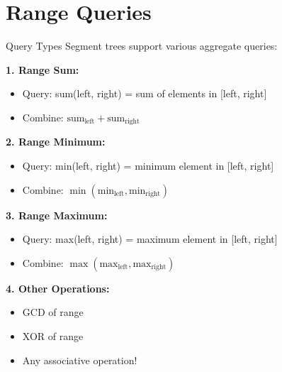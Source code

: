 \documentclass[aspectratio=169]{beamer}
\begin{document}
\section{Range Queries}

\begin{frame}{Query Types}
  Segment trees support various aggregate queries:

  \vspace{0.5cm}
  \textbf{1. Range Sum:}
  \begin{itemize}
    \item Query: sum(left, right) = sum of elements in [left, right]
    \item Combine: $\text{sum}_{\text{left}} + \text{sum}_{\text{right}}$
  \end{itemize}

  \vspace{0.3cm}
  \textbf{2. Range Minimum:}
  \begin{itemize}
    \item Query: min(left, right) = minimum element in [left, right]
    \item Combine: $\min(\text{min}_{\text{left}}, \text{min}_{\text{right}})$
  \end{itemize}

  \vspace{0.3cm}
  \textbf{3. Range Maximum:}
  \begin{itemize}
    \item Query: max(left, right) = maximum element in [left, right]
    \item Combine: $\max(\text{max}_{\text{left}}, \text{max}_{\text{right}})$
  \end{itemize}

  \vspace{0.3cm}
  \textbf{4. Other Operations:}
  \begin{itemize}
    \item GCD of range
    \item XOR of range
    \item Any associative operation!
  \end{itemize}
\end{frame}
\end{document}
